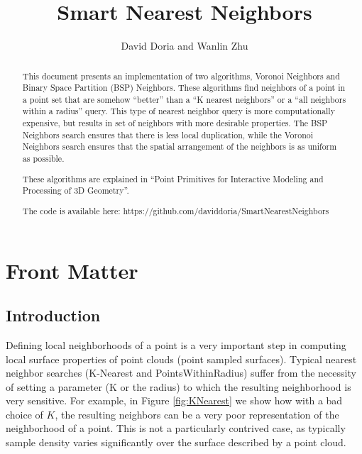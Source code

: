 \documentclass{InsightArticle}
\title{Smart Nearest Neighbors}
\author{David Doria and Wanlin Zhu}
\newcommand{\IJhandlerIDnumber}{3250}
\begin{document}
\IJhandlefooter{\IJhandlerIDnumber}


\ifpdf
\else
\fi


\maketitle


\ifhtml
\chapter*{Front Matter\label{front}}
\fi

\begin{abstract}
\noindent

This document presents an implementation of two algorithms, Voronoi Neighbors and Binary Space Partition (BSP) Neighbors. These algorithms find neighbors of a point in a point set that are somehow ``better'' than a ``K nearest neighbors'' or a ``all neighbors within a radius'' query. This type of nearest neighbor query is more computationally expensive, but results in set of neighbors with more desirable properties. The BSP Neighbors search ensures that there is less local duplication, while the Voronoi Neighbors search ensures that the spatial arrangement of the neighbors is as uniform as possible.

These algorithms are explained in ``Point Primitives for Interactive Modeling and Processing of 3D Geometry''.

The code is available here:
https://github.com/daviddoria/SmartNearestNeighbors

\end{abstract}

\IJhandlenote{\IJhandlerIDnumber}

\tableofcontents
\section{Introduction}
Defining local neighborhoods of a point is a very important step in computing local surface properties of point clouds (point sampled surfaces). Typical nearest neighbor searches (K-Nearest and PointsWithinRadius) suffer from the necessity of setting a parameter (K or the radius) to which the resulting neighborhood is very sensitive. For example, in Figure \ref{fig:KNearest} we show how with a bad choice of $K$, the resulting neighbors can be a very poor representation of the neighborhood of a point. This is not a particularly contrived case, as typically sample density varies significantly over the surface described by a point cloud.
\end{document}
